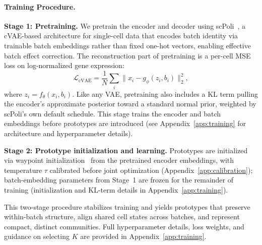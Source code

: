 \paragraph{Training Procedure.}

\textbf{Stage 1: Pretraining.}
We pretrain the encoder and decoder using scPoli~\citep{scpoli}, a cVAE-based architecture for single-cell data that encodes batch identity via trainable batch embeddings rather than fixed one-hot vectors, enabling effective batch effect correction.
The reconstruction part of pretraining is a per-cell MSE loss on log-normalized gene expression:
\begin{equation}
\mathcal{L}_{\text{cVAE}} =
\frac{1}{N}\sum_i \|x_i - g_\phi(z_i, b_i)\|_2^2,
\end{equation}
where $z_i = f_\theta(x_i, b_i)$. Like any VAE, pretraining also includes a KL term pulling the encoder's approximate posterior toward a standard normal prior, weighted by scPoli's own default schedule. This stage trains the encoder and batch embeddings before prototypes are introduced (see Appendix~\ref{app:training} for architecture and hyperparameter details).

\textbf{Stage 2: Prototype initialization and learning.}
Prototypes are initialized via waypoint initialization~\citep{seacells} from the pretrained encoder embeddings, with temperature $\tau$ calibrated before joint optimization (Appendix~\ref{app:calibration}); batch-embedding parameters from Stage~1 are frozen for the remainder of training (initialization and KL-term details in Appendix~\ref{app:training}).

This two-stage procedure stabilizes training and yields prototypes that preserve within-batch structure, align shared cell states across batches, and represent compact, distinct communities.
Full hyperparameter details, loss weights, and guidance on selecting $K$ are provided in Appendix~\ref{app:training}.